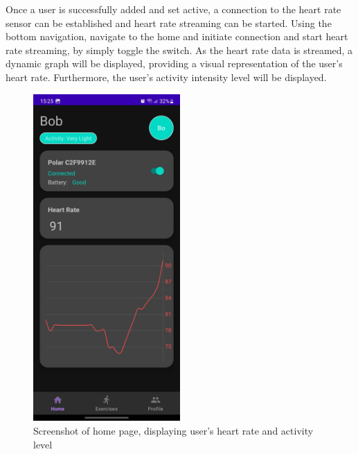 Once a user is successfully added and set active, a connection to the heart rate sensor can be established and heart rate streaming can be started.
Using the bottom navigation, navigate to the home and initiate connection and start heart rate streaming, by simply toggle the switch. 
As the heart rate data is streamed, a dynamic graph will be displayed, providing a visual representation of the user's heart rate.
Furthermore, the user's activity intensity level will be displayed.
\begin{figure}[H]
    \centering
    \includegraphics[width=0.5\textwidth]{images/home-sc.jpeg}
    \caption{Screenshot of home page, displaying user's heart rate and activity level}
    \label{fig:home_screenshot}
\end{figure}

